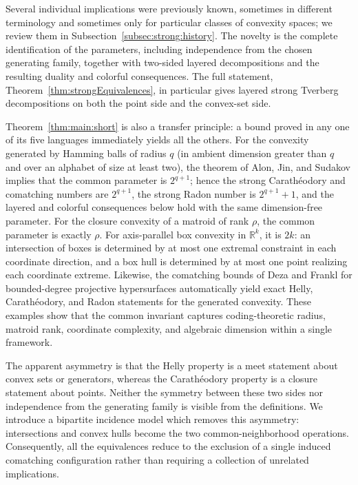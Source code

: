 \documentclass[11pt]{article}
\theoremstyle{definition}
\renewcommand{\Re}{\mathbb{R}}
\begin{document}
Several individual implications were previously known, sometimes in different terminology and sometimes only for particular classes of convexity spaces; we review them in Subsection~\ref{subsec:strong:history}. The novelty is the complete identification of the parameters, including independence from the chosen generating family, together with two-sided layered decompositions and the resulting duality and colorful consequences. The full statement, Theorem~\ref{thm:strongEquivalences}, in particular gives layered strong Tverberg decompositions on both the point side and the convex-set side.



Theorem~\ref{thm:main:short} is also a transfer principle: a bound proved in any one of its five languages immediately yields all the others. For the convexity generated by Hamming balls of radius $q$ (in ambient dimension greater than $q$ and over an alphabet of size at least two), the theorem of Alon, Jin, and Sudakov implies that the common parameter is $2^{q+1}$; hence the strong Carath\'eodory and comatching numbers are $2^{q+1}$, the strong Radon number is $2^{q+1}+1$, and the layered and colorful consequences below hold with the same dimension-free parameter. For the closure convexity of a matroid of rank $\rho$, the common parameter is exactly $\rho$. For axis-parallel box convexity in $\Re^k$, it is $2k$: an intersection of boxes is determined by at most one extremal constraint in each coordinate direction, and a box hull is determined by at most one point realizing each coordinate extreme. Likewise, the comatching bounds of Deza and Frankl for bounded-degree projective hypersurfaces automatically yield exact Helly, Carath\'eodory, and Radon statements for the generated convexity. These examples show that the common invariant captures coding-theoretic radius, matroid rank, coordinate complexity, and algebraic dimension within a single framework.




The apparent asymmetry is that the Helly property is a meet statement about convex sets or generators, whereas the Carath\'eodory property is a closure statement about points. Neither the symmetry between these two sides nor independence from the generating family is visible from the definitions. We introduce a bipartite incidence model which removes this asymmetry: intersections and convex hulls become the two common-neighborhood operations. Consequently, all the equivalences reduce to the exclusion of a single induced comatching configuration rather than requiring a collection of unrelated implications.
\end{document}
